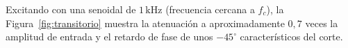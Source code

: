 Excitando con una senoidal de $1\,\mathrm{kHz}$ (frecuencia cercana a $f_c$), la Figura~\ref{fig:transitorio} muestra la atenuación a aproximadamente $0{,}7$ veces la amplitud de entrada y el retardo de fase de unos $-45^\circ$ característicos del corte.
